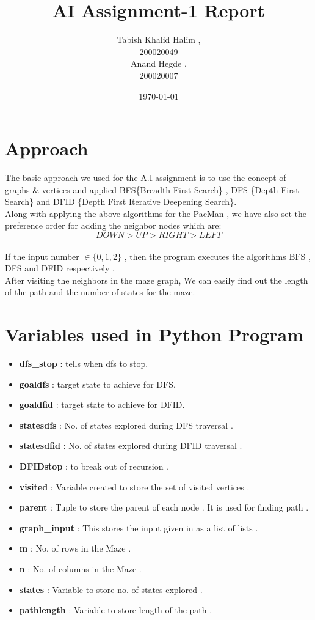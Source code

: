 \documentclass{article}
\title{AI Assignment-1 Report}
\date{\today}
\author{Tabish Khalid Halim , \\ 200020049 \\ Anand Hegde , \\ 200020007}
\affil{Department of Computer Science, IIT Dharwad}
\begin{document}
\maketitle
{}
\newpage
\tableofcontents

\newpage
{}
\section{Approach}
The basic approach we used for the A.I assignment is to use the concept of graphs \& vertices and 
applied BFS\{Breadth First Search\} , DFS \{Depth First Search\} and DFID \{Depth First Iterative Deepening Search\}.
\vspace{10pt}
\\
Along with applying the above algorithms for the PacMan , we have also set the preference order for adding the neighbor nodes which are:
\\$$DOWN > UP > RIGHT > LEFT$$
\vspace{10pt}
\\If the input number $\in \{0,1,2\}$ , then the program executes the algorithms BFS , DFS and DFID respectively .
\vspace{10pt}
\\After visiting the neighbors in the maze graph, We can easily find out the length of the path and the number of states for the maze.
\newpage
\section{Variables used in Python Program}
\vspace{20pt}
\begin{itemize}
    \item \textbf{dfs\_stop} : tells when dfs to stop.
    \item \textbf{goaldfs} : target state to achieve for DFS.
    \item \textbf{goaldfid} : target state to achieve for DFID.
    \item \textbf{statesdfs} : No. of states explored during DFS traversal .
    \item \textbf{statesdfid} : No. of states explored during DFID traversal .
    \item \textbf{DFIDstop} : to break out of recursion .
    \item \textbf{visited} :  Variable created to store the set of visited vertices .
    \item \textbf{parent} : Tuple to store the parent of each node . It is used for finding path .
    \item \textbf{graph\_input} :  This stores the input given in as a list of lists .
    \item \textbf{m} : No. of rows in the Maze .
    \item \textbf{n} : No. of columns in the Maze .
    \item \textbf{states} : Variable to store no. of states explored .
    \item \textbf{pathlength} : Variable to store length of the path .
\end{itemize}
\newpage
\end{document}
